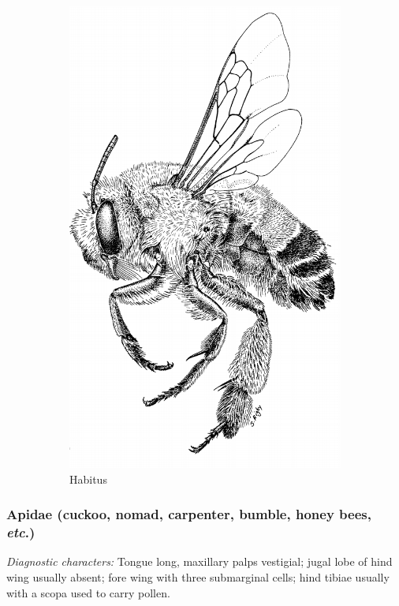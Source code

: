 \documentclass[letterpaper, 11pt]{article}
\begin{document}
\begin{figure}[ht!]
\begin{subfigure}[ht!]{0.32\textwidth}
        \includegraphics[width=\textwidth]{ApidHabitus}
        \caption{Habitus \citep[][Fig. 123]{goulet1993hymenoptera}}
        \label{fig:apid1}
    \end{subfigure}
    \caption{}\label{fig:notused}
\end{figure}

\subsubsection{Apidae (cuckoo, nomad, carpenter, bumble, honey bees, \textit{etc}.)}
\noindent{}\textit{Diagnostic characters:} Tongue long, maxillary palps vestigial; jugal lobe of hind wing usually absent; fore wing with three submarginal cells; hind tibiae usually with a scopa used to carry pollen.\\
\end{document}
